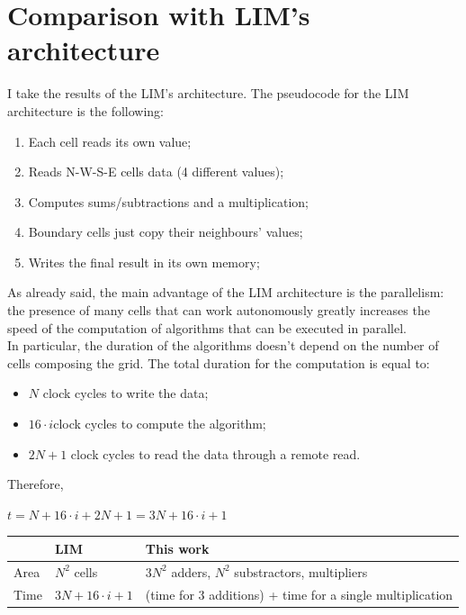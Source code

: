 \section{Comparison with LIM's architecture}
I take the results of the LIM's architecture. 
The pseudocode for the LIM architecture is the following:
\begin{enumerate}
 \item Each cell reads its own value; 
 \item Reads N-W-S-E cells data (4 different values);
 \item Computes sums/subtractions and a multiplication; 
 \item Boundary cells just copy their neighbours' values;
 \item Writes the final result in its own memory;
\end{enumerate}
As already said, the main advantage of the LIM architecture is the parallelism: the presence of many cells that can work autonomously greatly increases the speed of the computation of algorithms that can be executed in parallel.\\
In particular, the duration of the algorithms doesn't depend on the number of cells composing the grid.
The total duration for the computation is equal to:
\begin{itemize}
\item $ N $ clock cycles to write the data;
 \item $ 16 \cdot i  $clock cycles to compute the algorithm;
 \item $ 2N+1 $ clock cycles to read the data through a remote read.\\
\end{itemize}
Therefore,
\begin{center}
	$ t =  N + 16\cdot i +2N +1=3N + 16\cdot i +1  $
\end{center}
   \begin{center}
   	\begin{tabular}{ | p{1.8cm} | >{\centering\arraybackslash}p{6cm} | >{\centering\arraybackslash}p{6cm} | }
   		\hline
   		\label{table:tep_tab} & LIM & This work \\
   		\hline
   		Area & $ N^{2}$  cells   & $3N^{2}
   		$  adders, $N^{2}$ substractors, multipliers \\
   		\hline
   		Time & $3N + 16\cdot i +1 $&
   		
   		(time for 3 additions) + time for a single multiplication 
   		\\
   		\hline
   		
   	\end{tabular}
   \end{center}